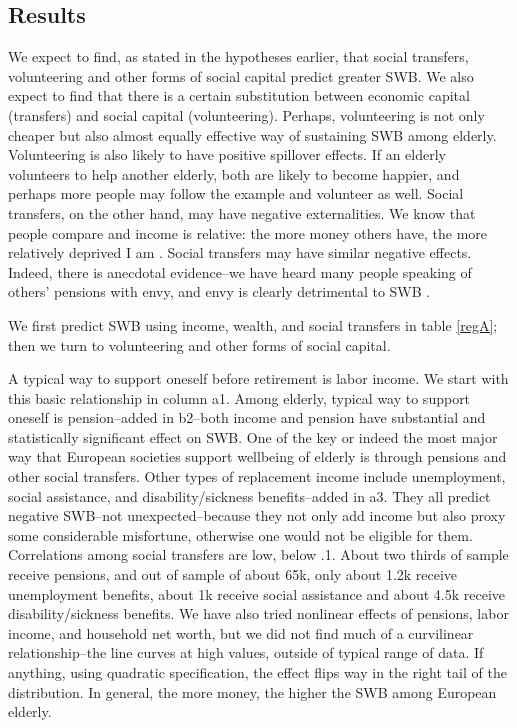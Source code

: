 \documentclass[10pt, letterpaper]{article}
\begin{document}
\begin{spacing}{1.4}
\section{Results}


 We expect to
find, as stated in the hypotheses earlier, that social transfers, volunteering
and other forms of social capital predict greater SWB. We also expect to
find that there is a  certain substitution  between economic capital (transfers) and social
capital (volunteering). Perhaps, volunteering is not only cheaper but also almost equally
effective way of sustaining SWB among elderly. Volunteering is also likely to have
positive spillover effects. If an elderly volunteers to help another elderly,
both are  likely to become happier, and perhaps more people may follow the
example and volunteer as well. Social transfers, on the other hand, may have
negative externalities. We know that people compare and income is relative: the
more money others have, the more relatively deprived I am
\citep{michalos85,luttmer05,bender12}. Social transfers may have similar negative
effects. Indeed, there is anecdotal evidence--we have heard many people speaking
of others' pensions with envy, and envy is clearly detrimental to SWB \citep{mujcic17}.

We first predict SWB using income, wealth, and social transfers in table \ref{regA}; then we turn
to volunteering and other forms of social capital.

A typical way to support oneself
before retirement is labor
income. We start with this basic relationship in column a1. Among elderly,
 typical way to support oneself is pension--added in b2--both income and pension 
have substantial and statistically significant effect on SWB. 
%
One of the key or indeed the most major way that European societies support
wellbeing of elderly is through pensions and other social transfers.
%
Other types of replacement income include unemployment, social assistance, and disability/sickness
benefits--added in a3. They all predict negative SWB--not unexpected--because
they not only add income but also proxy some considerable misfortune,
otherwise one would not be eligible for them. 
%
Correlations among social transfers are low, below .1. About two thirds of
sample receive pensions, and out of sample of about 65k, only about 1.2k receive
unemployment benefits,  about 1k receive social assistance and about 4.5k
receive disability/sickness benefits.
%
We have also tried nonlinear effects of pensions, labor income, and household
net worth, but we did not find much of a curvilinear
relationship--the line curves at high values, outside of typical range of data. If anything, using quadratic specification, the effect flips way in the right tail of the distribution.
In general, the more money, the higher the SWB among European elderly. 


\end{spacing}
\end{document}
